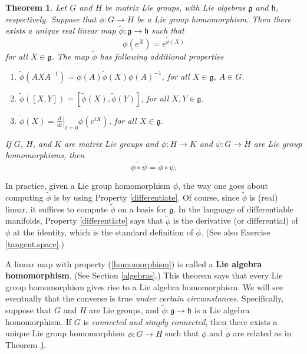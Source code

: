 \documentclass[12pt]{amsbook}
\let \frak = \mathfrak
\theoremstyle{plain}
\newtheorem{theorem}{Theorem}
\numberwithin{equation}{chapter}
\numberwithin{theorem}{chapter}
\begin{document}
\begin{theorem}
\label{homo.theorem}Let $G$ and $H$ be matrix Lie groups, with Lie algebras
$\frak{g}$ and $\frak{h}$, respectively. Suppose that $\phi:G\rightarrow H$ be
a Lie group homomorphism. Then there exists a unique real linear map
$\widetilde{\phi}:\frak{g}\rightarrow\frak{h}$ such that
\[
\phi(e^{X})=e^{\widetilde{\phi}(X)}%
\]
for all $X\in\frak{g}$. The map $\widetilde{\phi}$ has following additional properties

\begin{enumerate}
\item $\widetilde{\phi}\left(  AXA^{-1}\right)  =\phi(A)\widetilde{\phi
}(X)\phi(A)^{-1}$, for all $X\in\frak{g}$, $A\in G$.

\item \label{homomorphism}$\widetilde{\phi}(\left[  X,Y\right]  )=\left[
\widetilde{\phi}(X),\widetilde{\phi}(Y)\right]  $, for all $X,Y\in\frak{g}$.

\item \label{differentiate}$\widetilde{\phi}(X)=\left.  \frac{d}{dt}\right|
_{t=0}\phi(e^{tX})$, for all $X\in\frak{g}$.
\end{enumerate}

If $G$, $H$, and $K$ are matrix Lie groups and $\phi:H\rightarrow K$ and
$\psi:G\rightarrow H$ are Lie group homomorphisms, then
\[
\widetilde{\phi\circ\psi}=\widetilde{\phi}\circ\widetilde{\psi}\text{.}%
\]
\end{theorem}

In practice, given a Lie group homomorphism $\phi$, the way one goes about
computing $\widetilde{\phi}$ is by using Property \ref{differentiate}. Of
course, since $\widetilde{\phi}$ is (real) linear, it suffices to compute
$\widetilde{\phi}$ on a basis for $\frak{g}$. In the language of
differentiable manifolds, Property \ref{differentiate} says that
$\widetilde{\phi}$ is the derivative (or differential) of $\phi$ at the
identity, which is the standard definition of $\widetilde{\phi}$. (See also
Exercise \ref{tangent.space}.)

A linear map with property (\ref{homomorphism}) is called a \textbf{Lie
algebra homomorphism}. (See Section \ref{algebras}.) This theorem says that
every Lie group homomorphism gives rise to a Lie algebra homomorphism. We will
see eventually that the converse is true \textit{under certain circumstances}.
Specifically, suppose that $G$ and $H$ are Lie groups, and $\widetilde{\phi
}:\frak{g}\rightarrow\frak{h}$ is a Lie algebra homomorphism. If $G$ is
\textit{connected and simply connected}, then there exists a unique Lie group
homomorphism $\phi:G\rightarrow H$ such that $\phi$ and $\widetilde{\phi}$ are
related as in Theorem \ref{homo.theorem}.
\end{document}
